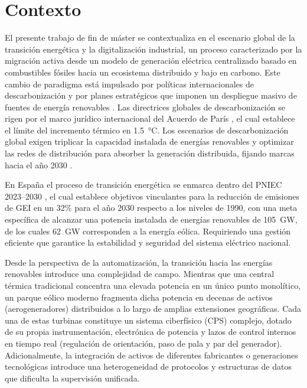 \chapter{Contexto}
\label{cap:contexto}
El presente trabajo de fin de máster se contextualiza en el escenario global de la transición energética y la digitalización industrial, un proceso caracterizado por la migración activa desde un modelo de generación eléctrica centralizado basado en combustibles fósiles hacia un ecosistema distribuido y bajo en carbono. Este cambio de paradigma está impulsado por políticas internacionales de descarbonización y por planes estratégicos que imponen un despliegue masivo de fuentes de energía renovables \cite{aee2026}. Las directrices globales de descarbonización se rigen por el marco jurídico internacional del Acuerdo de París \cite{unfcccParisAgreementPub}, el cual establece el límite del incremento térmico en 1.5~°C. Los escenarios de descarbonización global exigen triplicar la capacidad instalada de energías renovables y optimizar las redes de distribución para absorber la generación distribuida, fijando marcas hacia el año 2030 \cite{ieaNetZero2023Update}.

En España el proceso de transición energética se enmarca dentro del \ac{PNIEC} 2023--2030 \cite{mitecoPNIEC2023}, el cual establece objetivos vinculantes para la reducción de emisiones de \ac{GEI} en un 32\% para el año 2030 respecto a los niveles de 1990, con una meta específica de alcanzar una potencia instalada de energías renovables de 105~GW, de los cuales 62~GW corresponden a la energía eólica. Requiriendo una gestión eficiente que garantice la estabilidad y seguridad del sistema eléctrico nacional.\par

Desde la perspectiva de la automatización, la transición hacia las energías renovables introduce una complejidad de campo. Mientras que una central térmica tradicional concentra una elevada potencia en un único punto monolítico, un parque eólico moderno fragmenta dicha potencia en decenas de activos (aerogeneradores) distribuidos a lo largo de amplias extensiones geográficas. Cada una de estas turbinas constituye un sistema ciberfísico (\ac{CPS}) complejo, dotado de su propia instrumentación, electrónica de potencia y lazos de control internos en tiempo real (regulación de orientación, paso de pala y par del generador). Adicionalmente, la integración de activos de diferentes fabricantes o generaciones tecnológicas introduce una heterogeneidad de protocolos y estructuras de datos que dificulta la supervisión unificada.\par 


